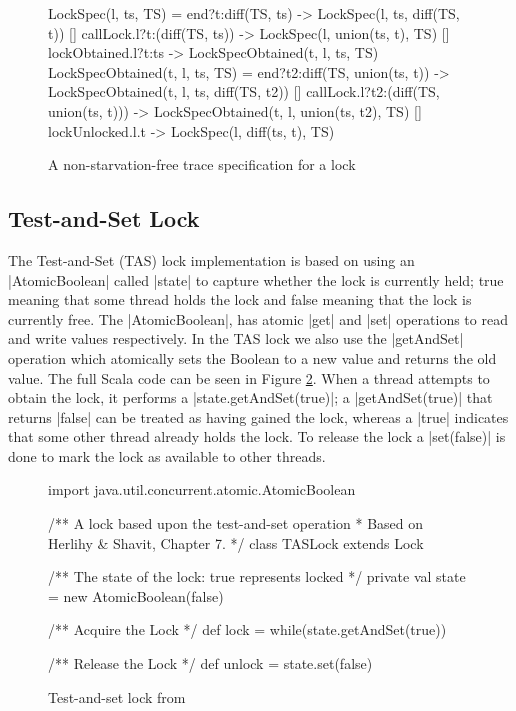 \begin{figure}
\begin{cspm}
  LockSpec(l, ts, TS) = 
    end?t:diff(TS, ts) -> LockSpec(l, ts, diff(TS, t))
    [] callLock.l?t:(diff(TS, ts)) -> LockSpec(l, union(ts, {t}), TS)
    [] lockObtained.l?t:ts -> LockSpecObtained(t, l, ts, TS)
  LockSpecObtained(t, l, ts, TS) = 
    end?t2:diff(TS, union(ts, t)) -> LockSpecObtained(t, l, ts, diff(TS, t2))
    [] callLock.l?t2:(diff(TS, union(ts, {t}))) -> 
        LockSpecObtained(t, l, union(ts, {t2}), TS)
    [] lockUnlocked.l.t -> LockSpec(l, diff(ts, {t}), TS)

\end{cspm}
\caption{A non-starvation-free trace specification for a lock}
\label{code:LockSpec}
\end{figure}

\subsection{Test-and-Set Lock}

The Test-and-Set (TAS) lock implementation is based on using an |AtomicBoolean| called |state| to capture whether the lock is currently held; true meaning that some thread holds the lock and false meaning that the lock is currently free. The |AtomicBoolean|, has atomic |get| and |set| operations to read and write values respectively. In the TAS lock we also use the |getAndSet| operation which atomically sets the Boolean to a new value and returns the old value. The full Scala code can be seen in Figure \ref{fig:TASScala}. When a thread attempts to obtain the lock, it performs a |state.getAndSet(true)|; a |getAndSet(true)| that returns |false| can be treated as having gained the lock, whereas a |true| indicates that some other thread already holds the lock. To release the lock a |set(false)| is done to mark the lock as available to other threads.

\begin{figure}
  \begin{scala}
  import java.util.concurrent.atomic.AtomicBoolean

  /** A lock based upon the test-and-set operation 
    * Based on Herlihy & Shavit, Chapter 7. */
  class TASLock extends Lock{
    /** The state of the lock: true represents locked */
    private val state = new AtomicBoolean(false)

    /** Acquire the Lock */ 
    def lock = while(state.getAndSet(true)){ }

    /** Release the Lock */
    def unlock = state.set(false)
  }
  \end{scala}
  \caption{Test-and-set lock from \cite{CADS}  \label{fig:TASScala}}
\end{figure}

